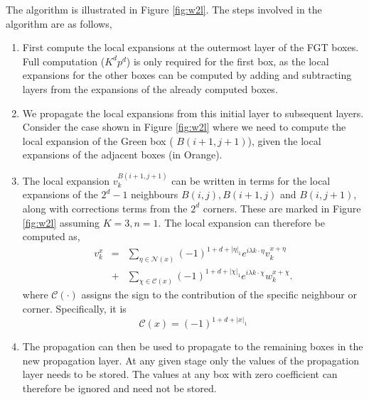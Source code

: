 The algorithm is illustrated in Figure \ref{fig:w2l}. The steps involved in the
algorithm are as follows, 
\begin{enumerate}    
  \item First compute the local expansions at the outermost layer of the FGT
    boxes. Full computation ($K^dp^d$) is only required for the first box, as
    the local expansions for the other boxes can be computed by adding and
    subtracting layers from the expansions of the already computed boxes. 
  
  \item We propagate the local expansions from this initial layer to subsequent
    layers. Consider the case shown in Figure \ref{fig:w2l} where we need to
    compute the local expansion of the Green box ( $B(i+1,j+1)$), given the
    local expansions of the adjacent boxes (in Orange).  
  
  \item The local expansion $v_k^{B(i+1, j+1)}$ can be written in terms for the
    local expansions of the $2^d -1$ neighbours $B(i,j), B(i+1,j)$ and
    $B(i,j+1)$, along with corrections terms from the $2^d$ corners.
    These are marked in Figure \ref{fig:w2l} assuming $K=3, n=1$. 
    The local expansion can therefore be computed as,
    \begin{eqnarray} 
    v_k^x &=& \sum_{\eta \in \mathcal{N}(x)} (-1)^{1 + d + |\eta|_1} e^{i\lambda k\cdot\eta} v_k^{x+\eta} \\
    & +& \sum_{\chi \in \mathcal{C}(x)} (-1)^{1 + d + |\chi|_1} e^{i\lambda k\cdot\chi} w_k^{x+\chi}. \label{eqn:sweep}
    \end{eqnarray}
    where $\mathcal{C}(\cdot)$ assigns the sign to the contribution of the specific neighbour or corner. Specifically, it is 
    \[
      \mathcal{C}(x) = (-1)^{1+d+|x|_1}
    \]
    
  
  \item The propagation can then be used to propagate to the remaining boxes in
    the new propagation layer. At any given stage only the values of the
    propagation layer needs to be stored. The values at any box with zero
    coefficient can therefore be ignored and need not be stored.

\end{enumerate}


